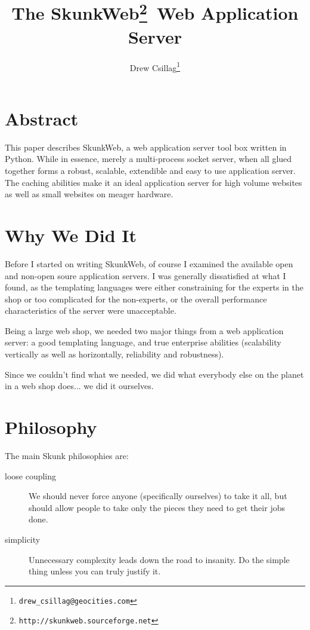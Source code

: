 \documentclass[twocolumn]{article}
\author{Drew Csillag\thanks{\texttt{drew\_csillag@geocities.com}}}
\title{The SkunkWeb\thanks{\texttt{http://skunkweb.sourceforge.net}}\ Web Application Server}
\begin{document}
\maketitle


\section*{Abstract}
This paper describes SkunkWeb, a web application server tool box
written in Python\cite{python}.  While in essence, merely a
multi-process socket server, when all glued together forms a robust,
scalable, extendible and easy to use application server.  The caching
abilities make it an ideal application server for high volume websites
as well as small websites on meager hardware.

\section{Why We Did It}
Before I started on writing SkunkWeb, of course I examined the
available open and non-open soure application servers.  I was
generally dissatisfied at what I found, as the templating languages
were either constraining for the experts in the shop or too
complicated for the non-experts, or the overall performance
characteristics of the server were unacceptable.


Being a large web shop, we needed two major things from a web
application server: a good templating language, and true enterprise
abilities (scalability vertically as well as horizontally, reliability
and robustness).

Since we couldn't find what we needed, we did what everybody else on
the planet in a web shop does... we did it ourselves.

\section{Philosophy}
The main Skunk philosophies are:
\begin{description}
\item[loose coupling] We should never force anyone (specifically
ourselves) to take it all, but should allow people to take only the
pieces they need to get their jobs done.
\item[simplicity] Unnecessary complexity leads down the road to
insanity.  Do the simple thing unless you can truly justify it.
\end{description}
\end{document}
